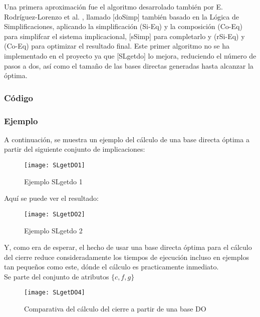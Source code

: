 Una primera aproximaci\'on  fue el algoritmo desarrolado tambi\'en por E. Rodr\'iguez-Lorenzo et al. \cite{doSimp}, llamado [doSimp] tambi\'en basado en la L\'ogica de Simplificaciones, aplicando la simplificaci\'on (Si-Eq) y la composici\'on (Co-Eq) para simplifcar el sistema implicacional, [sSimp] para completarlo y (rSi-Eq) y (Co-Eq) para optimizar el resultado final. Este primer algoritmo no se ha implementado en el proyecto ya que [SLgetdo] lo mejora, reduciendo el n\'umero de pasos a dos, as\'i como el tama\~no de las bases directas generadas hasta alcanzar la \'optima.
\newpage
\subsubsection{C\'odigo} 

\newpage

\newpage
\subsubsection{Ejemplo} 
A continuaci\'on, se muestra un ejemplo del c\'alculo de una base directa \'optima a partir del siguiente conjunto de implicaciones: 
\begin{figure}[H]
    \centering
    \texttt{[image: SLgetDO1]}
    \caption{Ejemplo SLgetdo 1}
    \label{fig:SLgetDO1}
\end{figure} 

Aqu\'i se puede ver el resultado:
\begin{figure}[H]
    \centering
    \texttt{[image: SLgetDO2]}
    \caption{Ejemplo SLgetdo 2}
    \label{fig:SLgetDO2}
\end{figure} 
Y, como era de esperar, el hecho de usar una base directa \'optima para el c\'alculo del cierre reduce consideradamente los tiempos de ejecuci\'on incluso en ejemplos tan peque\~nos como este, d\'onde el c\'alculo es practicamente inmediato.\\

Se parte del conjunto de atributos \(\{c,f,g\}\)

\begin{figure}[H]
    \centering
    \texttt{[image: SLgetDO4]}
    \caption{Comparativa del c\'alculo del cierre a partir de una base DO}
    \label{fig:SLgetDO4}
\end{figure}

